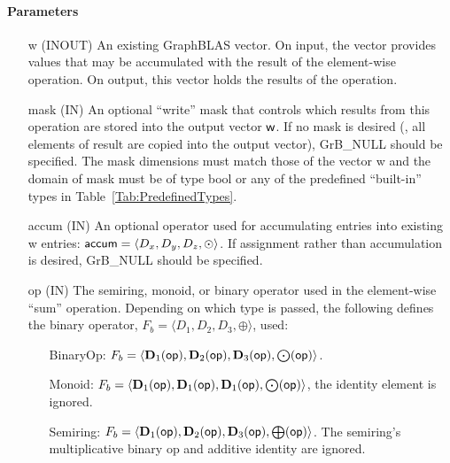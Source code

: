 \paragraph{Parameters}

\begin{itemize}[leftmargin=1.1in]
    \item[{\sf w}]    ({\sf INOUT}) An existing GraphBLAS vector.  On input,
    the vector provides values that may be accumulated with the result of the
    element-wise operation.  On output, this vector holds the results of the
    operation.

    \item[{\sf mask}]  ({\sf IN}) An optional ``write'' mask that controls which
    results from this operation are stored into the output vector
    ${\sf w}$.  If no mask is desired (\ie, all elements
    of result are copied into the output vector), {\sf GrB\_NULL}
    should be specified. The mask dimensions must match those of the
    vector {\sf w} and the domain of {\sf mask} must be
    of type {\sf bool} or any of the predefined ``built-in'' types in
    Table~\ref{Tab:PredefinedTypes}.

    \item[{\sf accum}] ({\sf IN}) An optional operator used for accumulating
    entries into existing {\sf w} entries: ${\sf accum} = \langle D_x,
    D_y, D_z,\odot \rangle$. If assignment rather than accumulation is
    desired, {\sf GrB\_NULL} should be specified.

    \item[{\sf op}]    ({\sf IN}) The semiring, monoid, or binary operator 
    used in the element-wise ``sum'' operation.  Depending on which type is
    passed, the following defines the binary operator, 
    $F_b=\langle D_1,D_2,D_3,\oplus\rangle$, used:
    \begin{itemize}[leftmargin=1.1in]
    \item[BinaryOp:] $F_b = \langle \bold{D}_1({\sf op}), \bold{D}_2({\sf op}),
    \bold{D}_3({\sf op}),\bold{\bigodot}({\sf op})\rangle$.  
    \item[Monoid:] $F_b = \langle \bold{D}_1({\sf op}), \bold{D}_1({\sf op}),
    \bold{D}_1({\sf op}),\bold{\bigodot}({\sf op})\rangle$,
    the identity element is ignored. 
    \item[Semiring:] $F_b = \langle \bold{D}_1({\sf op}), \bold{D}_2({\sf op}),
    \bold{D}_3({\sf op}),\bold{\bigoplus}({\sf op})\rangle$.  The semiring's 
    multiplicative binary op and additive identity are ignored.
    \end{itemize}
    

\end{itemize}
